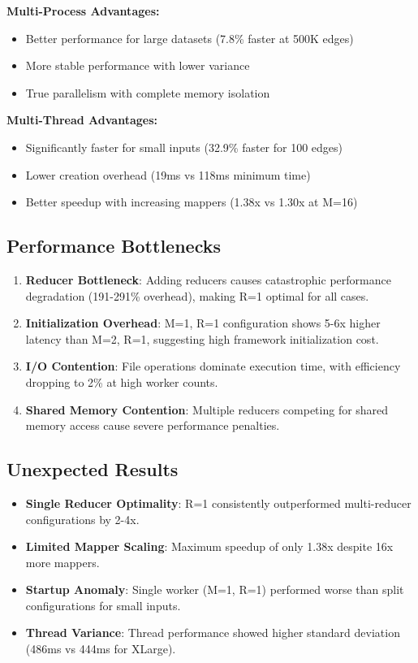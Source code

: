 \documentclass[11pt]{article}
\begin{document}
\textbf{Multi-Process Advantages:}
\begin{itemize}
    \item Better performance for large datasets (7.8\% faster at 500K edges)
    \item More stable performance with lower variance
    \item True parallelism with complete memory isolation
\end{itemize}

\textbf{Multi-Thread Advantages:}
\begin{itemize}
    \item Significantly faster for small inputs (32.9\% faster for 100 edges)
    \item Lower creation overhead (19ms vs 118ms minimum time)
    \item Better speedup with increasing mappers (1.38x vs 1.30x at M=16)
\end{itemize}

\subsection{Performance Bottlenecks}

\begin{enumerate}
    \item \textbf{Reducer Bottleneck}: Adding reducers causes catastrophic performance degradation (191-291\% overhead), making R=1 optimal for all cases.
    
    \item \textbf{Initialization Overhead}: M=1, R=1 configuration shows 5-6x higher latency than M=2, R=1, suggesting high framework initialization cost.
    
    \item \textbf{I/O Contention}: File operations dominate execution time, with efficiency dropping to 2\% at high worker counts.
    
    \item \textbf{Shared Memory Contention}: Multiple reducers competing for shared memory access cause severe performance penalties.
\end{enumerate}

\subsection{Unexpected Results}

\begin{itemize}
    \item \textbf{Single Reducer Optimality}: R=1 consistently outperformed multi-reducer configurations by 2-4x.
    \item \textbf{Limited Mapper Scaling}: Maximum speedup of only 1.38x despite 16x more mappers.
    \item \textbf{Startup Anomaly}: Single worker (M=1, R=1) performed worse than split configurations for small inputs.
    \item \textbf{Thread Variance}: Thread performance showed higher standard deviation (486ms vs 444ms for XLarge).
\end{itemize}
\end{document}
